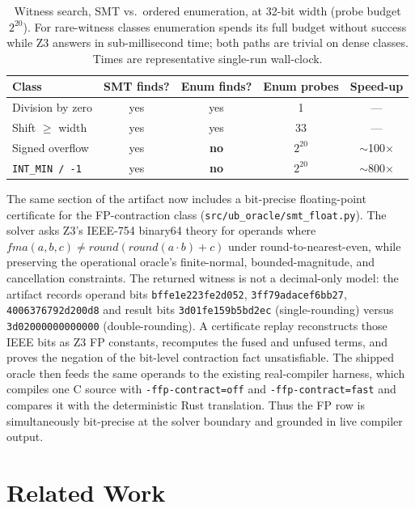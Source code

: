 \documentclass[10pt,a4paper]{article}
\begin{document}
\begin{table}[t]
\centering
\small
\caption{Witness search, SMT vs.\ ordered enumeration, at 32-bit width (probe
budget $2^{20}$). For rare-witness classes enumeration spends its full budget
without success while Z3 answers in sub-millisecond time; both paths are trivial
on dense classes. Times are representative single-run wall-clock.}
\label{tab:smtbench}
\begin{tabular}{@{}lcccc@{}}
\toprule
Class & SMT finds? & Enum finds? & Enum probes & Speed-up \\
\midrule
Division by zero        & yes & yes & 1            & --- \\
Shift $\geq$ width       & yes & yes & 33           & --- \\
Signed overflow         & yes & \textbf{no} & $2^{20}$ & $\sim$100$\times$ \\
\texttt{INT\_MIN / -1}  & yes & \textbf{no} & $2^{20}$ & $\sim$800$\times$ \\
\bottomrule
\end{tabular}
\end{table}

The same section of the artifact now includes a bit-precise floating-point
certificate for the FP-contraction class
(\texttt{src/ub\_oracle/smt\_float.py}).  The solver asks Z3's IEEE-754 binary64
theory for operands where
$\mathit{fma}(a,b,c) \neq \mathit{round}(\mathit{round}(a\cdot b)+c)$ under
round-to-nearest-even, while preserving the operational oracle's finite-normal,
bounded-magnitude, and cancellation constraints.  The returned witness is not a
decimal-only model: the artifact records operand bits
\texttt{bffe1e223fe2d052}, \texttt{3ff79adacef6bb27},
\texttt{4006376792d200d8} and result bits \texttt{3d01fe159b5bd2ec}
(single-rounding) versus \texttt{3d02000000000000} (double-rounding).  A
certificate replay reconstructs those IEEE bits as Z3 FP constants, recomputes
the fused and unfused terms, and proves the negation of the bit-level
contraction fact unsatisfiable.  The shipped oracle then feeds the same
operands to the existing real-compiler harness, which compiles one C source with
\texttt{-ffp-contract=off} and \texttt{-ffp-contract=fast} and compares it with
the deterministic Rust translation.  Thus the FP row is simultaneously
bit-precise at the solver boundary and grounded in live compiler output.

\section{Related Work}\label{sec:related}
\end{document}

